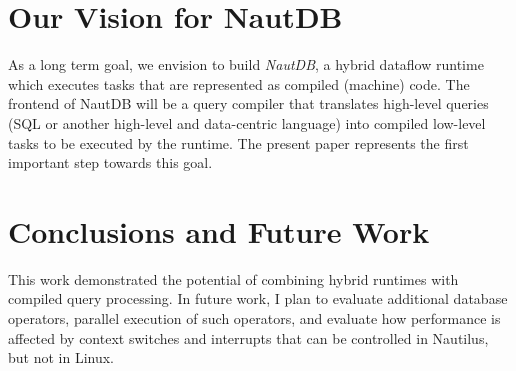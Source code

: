 \documentclass[conference]{IEEEtran}
\begin{document}
\section{Our Vision for NautDB}
\label{sec:our-vision-nautdb}

As a long term goal, we envision to build \emph{NautDB}, a hybrid dataflow runtime which executes tasks that are represented as compiled (machine) code. The frontend of NautDB will be a query compiler that translates high-level queries (SQL or another  high-level and data-centric language) into compiled low-level tasks to be executed by the runtime. The present paper represents the first important step towards this goal.


\section{Conclusions and Future Work}
\label{sec:concl-future-work}

This work demonstrated the potential of combining hybrid runtimes with compiled query processing. In future work, I plan to evaluate additional database operators, parallel execution of such operators, and evaluate how performance is affected by  context switches and interrupts  that can be controlled in Nautilus, but not in Linux.

  
  
\end{document}
